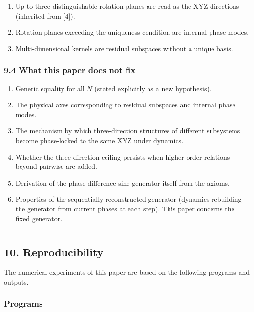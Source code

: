 \documentclass[
  a4paper,
]{article}
\providecommand{\tightlist}{%
  \setlength{\itemsep}{0pt}\setlength{\parskip}{0pt}}
\begin{document}
\begin{enumerate}
\def\labelenumi{\arabic{enumi}.}
\tightlist
\item
  Up to three distinguishable rotation planes are read as the XYZ
  directions (inherited from {[}4{]}).
\item
  Rotation planes exceeding the uniqueness condition are internal phase
  modes.
\item
  Multi-dimensional kernels are residual subspaces without a unique
  basis.
\end{enumerate}

\subsubsection{9.4 What this paper does not
fix}\label{what-this-paper-does-not-fix}

\begin{enumerate}
\def\labelenumi{\arabic{enumi}.}
\tightlist
\item
  Generic equality for all \(N\) (stated explicitly as a new
  hypothesis).
\item
  The physical axes corresponding to residual subspaces and internal
  phase modes.
\item
  The mechanism by which three-direction structures of different
  subsystems become phase-locked to the same XYZ under dynamics.
\item
  Whether the three-direction ceiling persists when higher-order
  relations beyond pairwise are added.
\item
  Derivation of the phase-difference sine generator itself from the
  axioms.
\item
  Properties of the sequentially reconstructed generator (dynamics
  rebuilding the generator from current phases at each step). This paper
  concerns the fixed generator.
\end{enumerate}

\begin{center}\rule{0.5\linewidth}{0.5pt}\end{center}

\subsection{10. Reproducibility}\label{reproducibility}

The numerical experiments of this paper are based on the following
programs and outputs.

\subsubsection{Programs}\label{programs}
\end{document}
